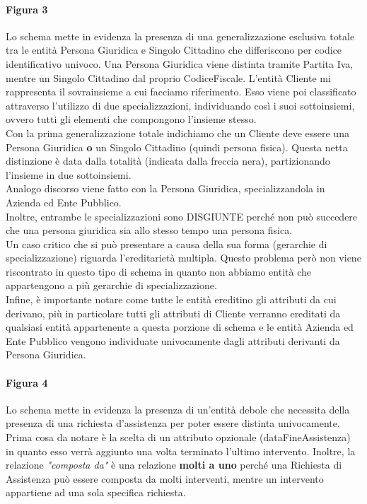\documentclass[legalpaper]{article}
\begin{document}
\paragraph{Figura 3}
Lo schema mette in evidenza la presenza di una generalizzazione esclusiva totale tra le entità Persona Giuridica e Singolo Cittadino che differiscono per codice identificativo univoco. Una Persona Giuridica viene distinta tramite Partita Iva, mentre un Singolo Cittadino dal proprio CodiceFiscale.
L'entità Cliente mi rappresenta il sovrainsieme a cui facciamo riferimento. Esso viene poi classificato attraverso l'utilizzo di due specializzazioni, individuando così i suoi sottoinsiemi, ovvero tutti gli elementi che compongono l'insieme stesso. \\
		Con la prima generalizzazione totale indichiamo che un Cliente deve essere una Persona Giuridica \textbf{o} un Singolo Cittadino (quindi persona fisica). Questa netta distinzione è data dalla totalità (indicata dalla freccia nera), partizionando l'insieme in due sottoinsiemi.\\
		Analogo discorso viene fatto con la Persona Giuridica, specializzandola in Azienda ed Ente Pubblico.\\
		Inoltre, entrambe le specializzazioni sono DISGIUNTE perché non può succedere che una persona giuridica sia allo stesso tempo una persona fisica.\\
		Un caso critico che si può presentare a causa della sua forma (gerarchie di specializzazione) riguarda l'ereditarietà multipla. Questo problema però non viene riscontrato in questo tipo di schema in quanto non abbiamo entità che appartengono a più gerarchie di specializzazione.\\
		Infine, è importante notare come tutte le entità ereditino gli attributi da cui derivano, più in particolare tutti gli attributi di Cliente verranno ereditati da qualsiasi entità appartenente a questa porzione di schema e le entità Azienda ed Ente Pubblico vengono individuate univocamente dagli attributi derivanti da Persona Giuridica.\\
\paragraph{Figura 4} 
Lo schema mette in evidenza la presenza di un'entità debole che necessita della presenza di una richiesta d'assistenza per poter essere distinta univocamente.
Prima cosa da notare è la scelta di un attributo opzionale (dataFineAssistenza) in quanto esso verrà aggiunto una volta terminato l'ultimo intervento.
		Inoltre, la relazione \textit{"composta da"} è una relazione \textbf{molti a uno} perché una Richiesta di Assistenza può essere composta da molti interventi, mentre un intervento 
		appartiene ad una sola specifica richiesta.\\
		
\end{document}
